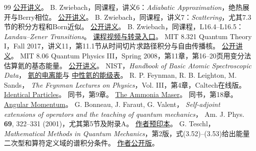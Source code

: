 \begin{thebibliography}{99}
    \href{https://ocw.mit.edu/courses/8-06-quantum-physics-iii-spring-2018/resources/chapter-4-time-dependent-perturbation-theory/}{公开讲义}。
    B. Zwiebach，同课程，讲义6：\textit{Adiabatic Approximation}，绝热展开与Berry相位。
    \href{https://ocw.mit.edu/courses/8-06-quantum-physics-iii-spring-2018/resources/chapter-6-adiabatic-approximation/}{公开讲义}。
    B. Zwiebach，同课程，讲义7：\textit{Scattering}，尤其7.3节的积分方程和Born近似。
    \href{https://ocw.mit.edu/courses/8-06-quantum-physics-iii-spring-2018/resources/chapter-7-scattering/}{公开讲义}。
    B. Zwiebach，同课程，L16.4--L16.5：\textit{Landau--Zener Transitions}。
    \href{https://ocw.mit.edu/courses/8-06-quantum-physics-iii-spring-2018/resources/l16-4/}{课程视频与转录入口}。
    MIT 8.321 Quantum Theory I，Fall 2017，讲义11，第11.1节从时间切片求路径积分与自由传播核。
    \href{https://ocw.mit.edu/courses/8-321-quantum-theory-i-fall-2017/ea27e6d1653b49990d3d9d317d570328_MIT8_321F17_lec11.pdf}{公开讲义}。
    MIT 8.06 Quantum Physics III，Spring 2008，第11章，第16--20页用变分法估算氦的基态能量。
    \href{https://stuff.mit.edu/afs/athena/course/8/8.06/spring08/handouts/Chapt11.pdf}{公开讲义}。
    NIST，\textit{Handbook of Basic Atomic Spectroscopic Data}，
    \href{https://physics.nist.gov/PhysRefData/Handbook/Tables/heliumtable1.htm}{氦的电离能}与
    \href{https://physics.nist.gov/PhysRefData/Handbook/Tables/heliumtable5.htm}{中性氦的能级表}。
    R. P. Feynman, R. B. Leighton, M. Sands，
    \textit{The Feynman Lectures on Physics}，Vol. III，第4章，Caltech在线版。
    \href{https://www.feynmanlectures.caltech.edu/III_04.html}{Identical Particles}。
    同书，第9章。
    \href{https://www.feynmanlectures.caltech.edu/III_09.html}{The Ammonia Maser}。
    同书，第18章。
    \href{https://www.feynmanlectures.caltech.edu/III_18.html}{Angular Momentum}。
    G. Bonneau, J. Faraut, G. Valent，
    \textit{Self-adjoint extensions of operators and the teaching of quantum mechanics}，
    Am. J. Phys. \textbf{69}, 322--331 (2001)，尤其第5节及附录A。
    \href{https://arxiv.org/abs/quant-ph/0103153}{作者预印本}。
    G. Teschl，\textit{Mathematical Methods in Quantum Mechanics}，第2版，式(3.52)--(3.53)给出能量二次型和算符定义域的谱积分条件。
    \href{https://www.mat.univie.ac.at/~gerald/ftp/book-schroe/schroe2.pdf}{作者公开版}。

\end{thebibliography}
